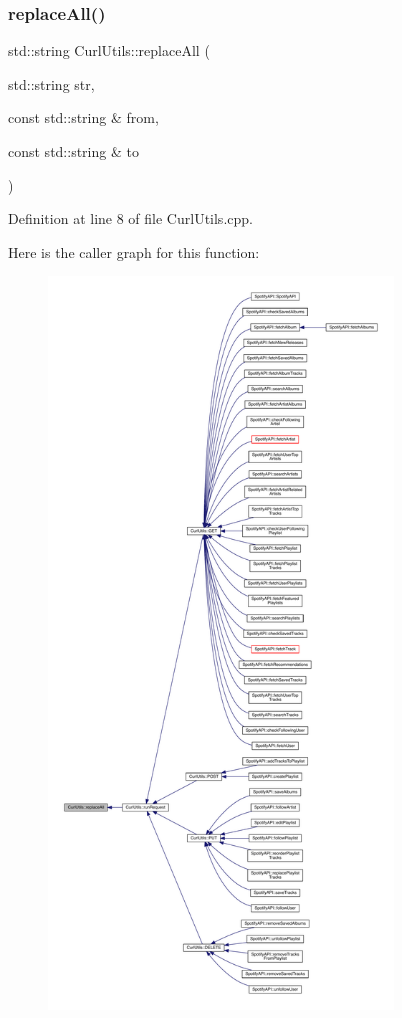 \subsubsection{\texorpdfstring{replace\+All()}{replaceAll()}}
{\footnotesize\ttfamily std\+::string Curl\+Utils\+::replace\+All (\begin{DoxyParamCaption}\item[{std\+::string}]{str,  }\item[{const std\+::string \&}]{from,  }\item[{const std\+::string \&}]{to }\end{DoxyParamCaption})\hspace{0.3cm}{\ttfamily [private]}}



Definition at line 8 of file Curl\+Utils.\+cpp.

Here is the caller graph for this function\+:
\nopagebreak
\begin{figure}[H]
\begin{center}
\leavevmode
\includegraphics[height=550pt]{class_curl_utils_a86211746c9f0981b56fd143996a10a4a_icgraph}
\end{center}
\end{figure}
\mbox{\label{class_curl_utils_a596d1f41d3e300c4c626b4e4f819c194}} 
